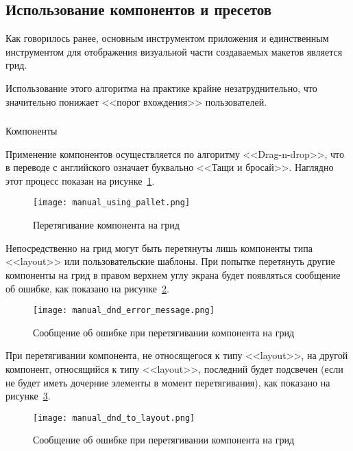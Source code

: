 \subsection{Использование компонентов и пресетов}
\label{sec:manual:components_manual}

Как говорилось ранее, основным инструментом приложения и единственным инструментом для отображения визуальной части создаваемых макетов является грид.

Использование этого алгоритма на практике крайне незатруднительно, что значительно понижает <<порог вхождения>> пользователей.

\subsubsection{}Компоненты
\

Применение компонентов осуществляется по алгоритму <<Drag-n-drop>>, что в переводе с английского означает буквально <<Тащи и бросай>>. Наглядно этот процесс показан на рисунке~\ref{sec:manual:manual_using_pallet}.

\begin{figure}[ht]
	\centering
    \texttt{[image: manual\_using\_pallet.png]}
    \caption{Перетягивание компонента на грид}
    \label{sec:manual:manual_using_pallet}
\end{figure}

Непосредственно на грид могут быть перетянуты лишь компоненты типа <<layout>> или пользовательские шаблоны. При попытке перетянуть другие компоненты на грид в правом верхнем углу экрана будет появляться сообщение об ошибке, как показано на рисунке~\ref{sec:manual:manual_dnd_error_message}.

\begin{figure}[ht]
	\centering
    \texttt{[image: manual\_dnd\_error\_message.png]}
    \caption{Сообщение об ошибке при перетягивании компонента на грид}
    \label{sec:manual:manual_dnd_error_message}
\end{figure}

При перетягивании компонента, не относящегося к типу <<layout>>, на другой компонент, относящийся к типу <<layout>>, последний будет подсвечен (если не будет иметь дочерние элементы в момент перетягивания), как показано на рисунке~\ref{sec:manual:manual_dnd_to_layout}.

\begin{figure}[ht]
	\centering
    \texttt{[image: manual\_dnd\_to\_layout.png]}
    \caption{Сообщение об ошибке при перетягивании компонента на грид}
    \label{sec:manual:manual_dnd_to_layout}
\end{figure}

